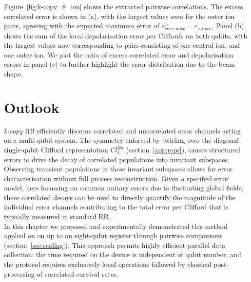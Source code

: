 Figure~\ref{fig:k-copy_8_ion} shows the 
extracted pairwise correlations. The excess correlated error is shown in (a), with the largest values seen for the outer ion pairs, agreeing with the expected maximum error of $\varepsilon_{corr, max}^>=\varepsilon_{c, max}$. Panel (b) shows the sum of the local depolarisation error per Cliffords on both qubits, with the largest values now corresponding to pairs consisting of one central ion, and one outer ion. We plot the ratio of excess correlated error and depolarisation errors in panel (c) to further highlight the error distribution due to the beam shape.
\section{Outlook}
\label{sec:outlook}
\emph{k-copy} RB efficiently discerns correlated and uncorrelated error channels
acting on a multi-qubit system. The symmetry enforced by
twirling over the diagonal single-qubit Clifford representation $Cl_1^{\otimes k}$
(section~\ref{app:reps}), causes structured errors to drive the decay of
correlated populations into invariant subspaces. Observing transient populations in these invariant subspaces allows for error characterisation without full process reconstruction. Given a specified error
model, here focussing on common unitary errors due to fluctuating global fields, these correlated decays can be used to directly quantify the
magnitude of the individual error channels contributing to the total error
per Clifford that is typically measured in standard RB.\\

In this chapter we proposed and experimentally demonstrated this method applied on on up to an eight-qubit register through pairwise
comparisons (section~\ref{sec:scaling}). This approach permits highly
efficient parallel data collection: the time required on the device is
independent of qubit number, and the protocol requires exclusively local
operations followed by classical post-processing of correlated survival
rates.\\

